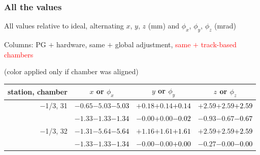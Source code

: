 \documentclass[compress]{beamer}
\begin{document}
\begin{frame}
\frametitle{All the values}
\tiny

All values relative to ideal, alternating $x$, $y$, $z$ (mm) and $\phi_x$, $\phi_y$, $\phi_z$ (mrad)

Columns: PG $+$ hardware, same $+$ global adjustment, \textcolor{red}{same $+$ track-based chambers}

\hfill (color applied only if chamber was aligned)

\vfill
\renewcommand{\arraystretch}{1.1}
\begin{tabular}{r | c | c | c}
station, chamber & $x$ or $\phi_x$ & $y$ or $\phi_y$ & $z$ or $\phi_z$ \\\hline
$-$1/3, 31 & $-0.65$\hspace{0.1 cm}$-5.03$\hspace{0.1 cm}\textcolor{black}{$-5.03$} & $+0.18$\hspace{0.1 cm}$+0.14$\hspace{0.1 cm}\textcolor{black}{$+0.14$} & $+2.59$\hspace{0.1 cm}$+2.59$\hspace{0.1 cm}\textcolor{black}{$+2.59$} \\
           & $-1.33$\hspace{0.1 cm}$-1.33$\hspace{0.1 cm}\textcolor{black}{$-1.34$} & $-0.00$\hspace{0.1 cm}$+0.00$\hspace{0.1 cm}\textcolor{black}{$-0.02$} & $-0.93$\hspace{0.1 cm}$-0.67$\hspace{0.1 cm}\textcolor{black}{$-0.67$} \\
$-$1/3, 32 & $-1.31$\hspace{0.1 cm}$-5.64$\hspace{0.1 cm}\textcolor{black}{$-5.64$} & $+1.16$\hspace{0.1 cm}$+1.61$\hspace{0.1 cm}\textcolor{black}{$+1.61$} & $+2.59$\hspace{0.1 cm}$+2.59$\hspace{0.1 cm}\textcolor{black}{$+2.59$} \\
           & $-1.33$\hspace{0.1 cm}$-1.33$\hspace{0.1 cm}\textcolor{black}{$-1.34$} & $-0.00$\hspace{0.1 cm}$-0.00$\hspace{0.1 cm}\textcolor{black}{$+0.00$} & $-0.27$\hspace{0.1 cm}$-0.00$\hspace{0.1 cm}\textcolor{black}{$-0.00$} \\

\end{tabular}
\end{frame}
\end{document}
